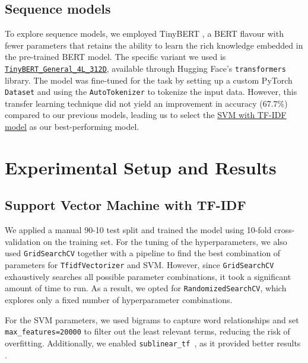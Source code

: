 \documentclass[twocolumn]{article}
\begin{document}
\subsection*{Sequence models}
\vspace{-0.2cm}
To explore sequence models, we employed TinyBERT \cite{tinybert}, a BERT \cite{bertpaper} flavour with fewer parameters that retains the ability to learn the rich knowledge embedded in the pre-trained BERT model. The specific variant we used is \href{https://huggingface.co/huawei-noah/TinyBERT_General_4L_312D}{\texttt{TinyBERT\_General\_4L\_312D}}, available through Hugging Face’s \texttt{transformers} library. 
The model was fine-tuned for the task by setting up a custom PyTorch \texttt{Dataset} and using the \texttt{AutoTokenizer} to tokenize the input data. However, this transfer learning technique did not yield an improvement in accuracy (67.7\%) compared to our previous models, leading us to select the \underline{SVM with TF-IDF model} as our best-performing model.

\section{Experimental Setup and Results}
\subsection*{Support Vector Machine with TF-IDF}
We applied a manual 90-10 test split and trained the model using 10-fold cross-validation on the training set. %
For the tuning of the hyperparameters, we also used \texttt{GridSearchCV} together with a pipeline to find the best combination of parameters for \texttt{TfidfVectorizer} and SVM. However, since \texttt{GridSearchCV} exhaustively searches all possible parameter combinations, it took a significant amount of time to run. As a result, we opted for \texttt{RandomizedSearchCV}, which explores only a fixed number of hyperparameter combinations. %

For the SVM parameters, we used bigrams to capture word relationships and set \texttt{max\_features=20000} to filter out the least relevant terms, reducing the risk of overfitting. Additionally, we enabled \texttt{sublinear\_tf%
}, as it provided better results \cite{fei2019movie}.
\end{document}
